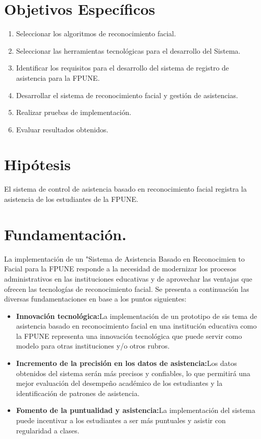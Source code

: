 \section{Objetivos Específicos}
\begin{enumerate}
    \item Seleccionar los algoritmos de reconocimiento facial.
    \item Seleccionar las herramientas tecnológicas para el desarrollo del Sistema.
    \item Identificar los requisitos para el desarrollo del sistema de registro de asistencia para la FPUNE.
    \item Desarrollar el sistema de reconocimiento facial y gestión de asistencias.
    \item Realizar pruebas de implementación.
    \item Evaluar resultados obtenidos.
\end{enumerate}

\section{Hipótesis}
El sistema de control de asistencia basado en reconocimiento facial registra
la asistencia de los estudiantes de la FPUNE.

\section{Fundamentación.}
La implementación de un "Sistema de Asistencia Basado en Reconocimien
to Facial para la FPUNE responde a la necesidad de modernizar los procesos
administrativos en las instituciones educativas y de aprovechar las ventajas que
ofrecen las tecnologías de reconocimiento facial. Se presenta a continuación las
diversas fundamentaciones en base a los puntos siguientes:
\begin{itemize}
    \item \textbf{Innovación tecnológica:}La implementación de un prototipo de sis
tema de asistencia basado en reconocimiento facial en una institución
educativa como la FPUNE representa una innovación tecnológica que
puede servir como modelo para otras instituciones y/o otros rubros.
    \item \textbf{Incremento de la precisión en los datos de asistencia:}Los datos
obtenidos del sistema serán más precisos y confiables, lo que permitirá
una mejor evaluación del desempeño académico de los estudiantes y la
identificación de patrones de asistencia.
    \item \textbf{Fomento de la puntualidad y asistencia:}La implementación del
    sistema puede incentivar a los estudiantes a ser más puntuales y asistir
    con regularidad a clases.
\end{itemize}

